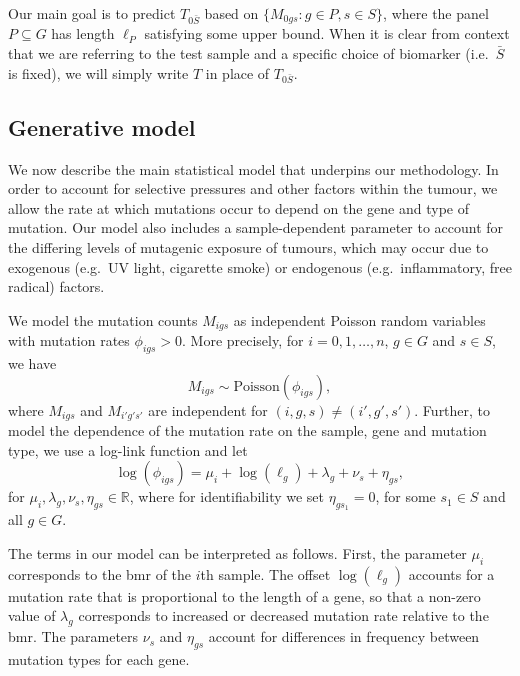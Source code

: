 \documentclass[../thesis.tex]{subfiles}
\begin{document}
Our main goal is to predict $T_{0\bar{S}}$ based on $\{M_{0gs}: g \in P, s \in S\}$, where the panel $P \subseteq G$ has length $\ell_P$ satisfying some upper bound. When it is clear from context that we are referring to the test sample and a specific choice of biomarker (i.e.~$\bar{S}$ is fixed), we will simply write $T$ in place of $T_{0\bar{S}}$. 

\subsection{Generative model \label{sec:genmodel}}
We now describe the main statistical model that underpins our methodology. In order to account for selective pressures and other factors within the tumour, we allow the rate at which mutations occur to depend on the gene and type of mutation. Our model also includes a sample-dependent parameter to account for the differing levels of mutagenic exposure of tumours, which may occur due to exogenous (e.g.~UV light, cigarette smoke) or endogenous (e.g.~inflammatory, free radical) factors.  

We model the mutation counts $M_{igs}$ as independent Poisson random variables with mutation rates $\phi_{igs} > 0$. More precisely, for $i = 0, 1, \ldots, n$, $g \in G$ and $s \in S$, we have
\begin{equation}
    \label{eq:Poisson}
M_{igs} \sim \mathrm{Poisson}(\phi_{igs}),
\end{equation}
where $M_{igs}$ and $M_{i'g's'}$ are independent for $(i,g,s) \neq (i',g',s')$.  Further, to model the dependence of the mutation rate on the sample, gene and mutation type, we use a log-link function and let 
\begin{equation}
    \label{eq:loglink}
\log(\phi_{igs}) =  \mu_i + \log(\ell_g) + \lambda_g + \nu_s + \eta_{gs},
\end{equation} 
for $\mu_i, \lambda_{g},\nu_{s},\eta_{gs} \in \mathbb{R}$, where for identifiability we set $\eta_{gs_1} = 0$, for  some $s_1 \in S$ and all $g \in G$. 

The terms in our model can be interpreted as follows. First, the parameter $\mu_i$ corresponds to the \gls{bmr} of the $i$th sample. The offset $\log(\ell_g)$ accounts for a mutation rate that is proportional to the length of a gene, so that a non-zero value of $\lambda_g$ corresponds to increased or decreased mutation rate relative to the \gls{bmr}.  The parameters $\nu_s$ and $\eta_{gs}$ account for differences in frequency between mutation types for each gene. 
\end{document}
